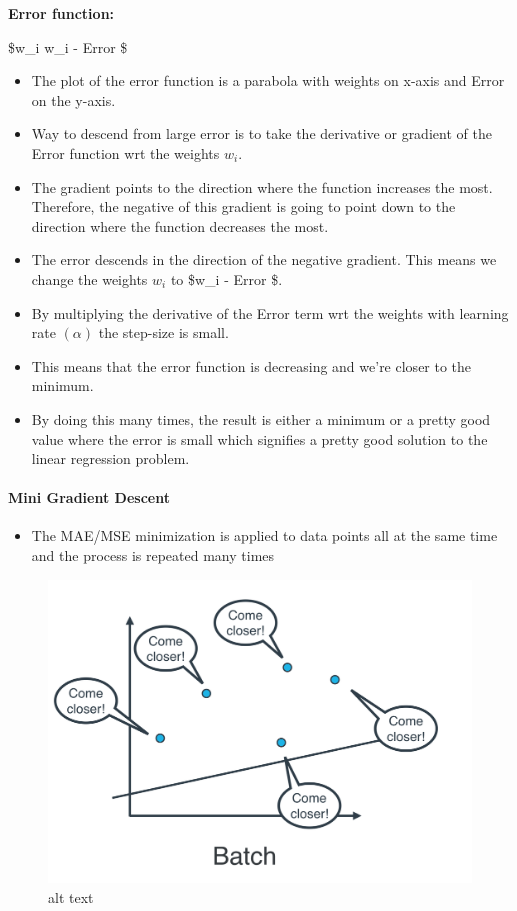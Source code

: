 \documentclass[11pt]{article}
\makeatletter
\def\maxwidth{\ifdim\Gin@nat@width>\linewidth\linewidth
    \else\Gin@nat@width\fi}
\let\Oldincludegraphics\includegraphics
\renewcommand{\includegraphics}[1]{\Oldincludegraphics[width=.8\maxwidth]{#1}}
\providecommand{\tightlist}{%
      \setlength{\itemsep}{0pt}\setlength{\parskip}{0pt}}
\makeatother
\begin{document}
\textbf{Error function:}

\$w\_i \to w\_i - \alpha {} Error \$

\begin{itemize}
\tightlist
\item
  The plot of the error function is a parabola with weights on x-axis
  and Error on the y-axis.
\item
  Way to descend from large error is to take the derivative or gradient
  of the Error function wrt the weights \(w_i\).
\item
  The gradient points to the direction where the function increases the
  most. Therefore, the negative of this gradient is going to point down
  to the direction where the function decreases the most.
\item
  The error descends in the direction of the negative gradient. This
  means we change the weights \(w_i\) to \$w\_i -
  \alpha {} Error \$.
\item
  By multiplying the derivative of the Error term wrt the weights with
  learning rate \((\alpha)\) the step-size is small.
\item
  This means that the error function is decreasing and we're closer to
  the minimum.
\item
  By doing this many times, the result is either a minimum or a pretty
  good value where the error is small which signifies a pretty good
  solution to the linear regression problem.
\end{itemize}

    \hypertarget{mini-gradient-descent}{%
\paragraph{Mini Gradient Descent}\label{mini-gradient-descent}}

\begin{itemize}
\tightlist
\item
  The MAE/MSE minimization is applied to data points all at the same
  time and the process is repeated many times
\end{itemize}

\begin{figure}
\centering
\includegraphics{batch.png}
\caption{alt text}
\end{figure}
\end{document}
